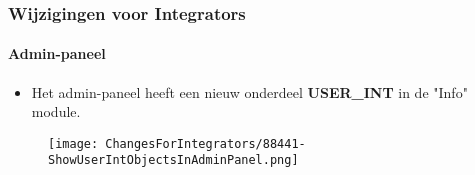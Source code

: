 
\begin{frame}[fragile]
	\frametitle{Wijzigingen voor Integrators}
	\framesubtitle{Admin-paneel}

	\begin{itemize}
		\item Het admin-paneel heeft een nieuw onderdeel \textbf{USER\_INT} in de "Info" module.
	\end{itemize}

	\begin{figure}
		\texttt{[image: ChangesForIntegrators/88441-ShowUserIntObjectsInAdminPanel.png]}
	\end{figure}

\end{frame}

